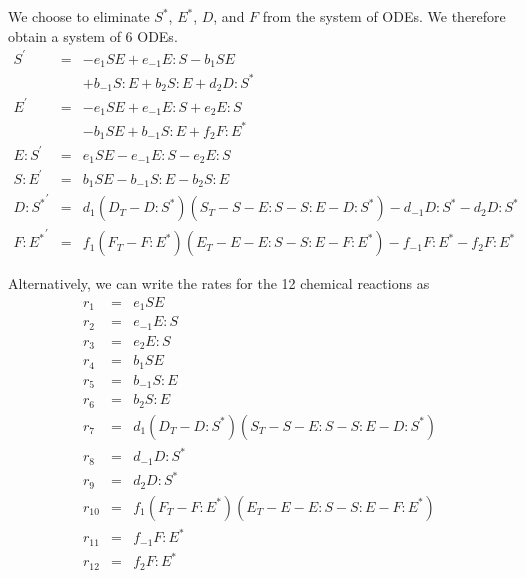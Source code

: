 \documentclass[aip,jcp,preprint]{revtex4-1}
\begin{document}
\begin{widetext}
We choose to eliminate $S^{*}$, $E^{*}$, $D$, and $F$ from the system of ODEs.
%
We therefore obtain a system of 6 ODEs.
\begin{equation}
    \begin{array}{rcl}
        S^\prime & = & -e_1 S E + e_{-1} E:S -b_1 S E \\
                        &   & + b_{-1} S:E + b_2 S:E + d_2 D:S^{*} \\
        E^\prime & = & -e_1 S E + e_{-1} E:S + e_2 E:S \\
                        &   & - b_1 S E +b_{-1} S:E + f_2 F:E^{*} \\
        E:S^\prime  & = & e_1 S E -e_{-1} E:S -e_2 E:S \\
        S:E^\prime & = & b_1 S E -b_{-1} S:E -b_2 S:E \\
        {D:S^{*}}^\prime & = & d_1 (D_T - D:S^{*}) (S_T - S - E:S - S:E - D:S^{*}) - d_{-1} D:S^{*} -d_2 D:S^{*} \\
        {F:E^{*}}^\prime & = & f_1 (F_T - F:E^{*}) (E_T - E - E:S - S:E - F:E^{*}) - f_{-1} F:E^{*} -f_2 F:E^{*}
    \end{array}
\end{equation}
\end{widetext}

Alternatively, we can write the rates for the 12 chemical reactions as
\begin{equation}
    \begin{array}{rcl}
        r_1 & = & e_1 S E \\
        r_2 & = & e_{-1} E:S \\
        r_3 & = & e_2 E:S \\
        r_4 & = & b_1 S E \\
        r_5 & = & b_{-1} S:E \\
        r_6 & = & b_2 S:E \\
        r_7 & = & d_1 (D_T - D:S^{*}) (S_T - S - E:S - S:E - D:S^{*}) \\
        r_8 & = & d_{-1} D:S^{*} \\
        r_9 & = & d_2 D:S^{*} \\
        r_{10} & = & f_1 (F_T - F:E^{*}) (E_T - E - E:S - S:E - F:E^{*}) \\
        r_{11} & = & f_{-1} F:E^{*} \\
        r_{12} & = & f_2 F:E^{*}
    \end{array}
\end{equation}
\end{document}
